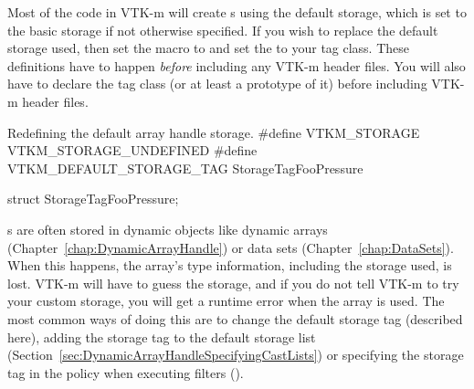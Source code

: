 Most of the code in VTK-m will create s using
the default storage, which is set to the basic storage if not otherwise
specified. If you wish to replace the default storage used, then set the
 macro to  and
set the  to your tag class. These
definitions have to happen \emph{before} including any VTK-m header files.
You will also have to declare the tag class (or at least a prototype of it)
before including VTK-m header files.

\begin{vtkmexample}{Redefining the default array handle storage.}
#define VTKM_STORAGE VTKM_STORAGE_UNDEFINED
#define VTKM_DEFAULT_STORAGE_TAG StorageTagFooPressure

struct StorageTagFooPressure;
\end{vtkmexample}

\begin{commonerrors}
  s are often stored in dynamic objects like
  dynamic arrays (Chapter~\ref{chap:DynamicArrayHandle}) or data sets
  (Chapter~\ref{chap:DataSets}). When this happens, the array's type
  information, including the storage used, is lost. VTK-m will have to
  guess the storage, and if you do not tell VTK-m to try your custom
  storage, you will get a runtime error when the array is used. The most
  common ways of doing this are to change the default storage tag
  (described here), adding the storage tag to the default storage list
  (Section~\ref{sec:DynamicArrayHandleSpecifyingCastLists}) or specifying
  the storage tag in the policy when executing filters ().
\end{commonerrors}





